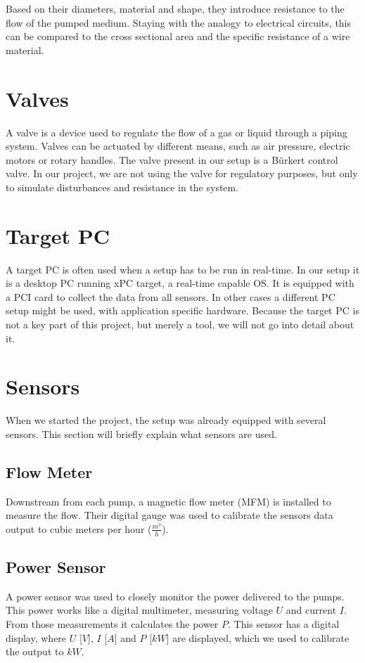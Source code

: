 Based on their diameters, material and shape,
they introduce resistance to the flow of the pumped medium.
Staying with the analogy to electrical circuits,
this can be compared to the cross sectional area and the specific resistance of a wire material.

\section{Valves}
A valve is a device used to regulate the flow of a gas or liquid through a piping system.
Valves can be actuated by different means, such as air pressure, electric motors or rotary handles.
The valve present in our setup is a Bürkert control valve.
In our project, we are not using the valve for regulatory purposes,
but only to simulate disturbances and resistance in the system.


\section{Target PC}
A target PC is often used when a setup has to be run in real-time.
In our setup it is a desktop PC running xPC target,
a real-time capable OS.
It is equipped with a PCI card to collect the data from all sensors. \cite{TargetPCSource}
In other cases a different PC setup might be used,
with application specific hardware.
Because the target PC is not a key part of this project,
but merely a tool,
we will not go into detail about it.

\section{Sensors}
When we started the project,
the setup was already equipped with several sensors.
This section will briefly explain what sensors are used.

\subsection*{Flow Meter}
Downstream from  each pump, a magnetic flow meter (MFM) \cite{MFM} is installed to measure the flow.
Their digital gauge was used to calibrate the sensors data output to cubic meters per hour ($\frac{m^3}{h}$).

\subsection*{Power Sensor}
A power sensor \cite{LMG} was used to closely monitor the power delivered to the pumps.
This power works like a digital multimeter,
measuring voltage $U$ and current $I$.
From those measurements it calculates the power $P$.
This sensor has a digital display, where $U$ [$V$], $I$ [$A$] and $P$ [$kW$] are displayed,
which we used to calibrate the output to $kW$.

